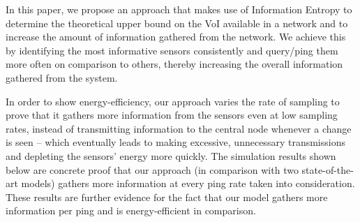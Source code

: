 In this paper, we propose an approach that makes use of Information
Entropy to determine the theoretical upper bound on the VoI available
in a network and to increase the amount of information gathered from
the network. We achieve this by identifying the most informative
sensors consistently and query/ping them more often on comparison to
others, thereby increasing the overall information gathered from the
system.

In order to show energy-efficiency, our approach varies the rate of
sampling to prove that it gathers more information from the sensors
even at low sampling rates, instead of transmitting information to the
central node whenever a change is seen -- which eventually leads to
making excessive, unnecessary transmissions and depleting the sensors'
energy more quickly. The simulation results shown below are concrete
proof that our approach (in comparison with two state-of-the-art
models) gathers more information at every ping rate taken into
consideration. These results are further evidence for the fact that
our model gathers more information per ping and is energy-efficient in
comparison.